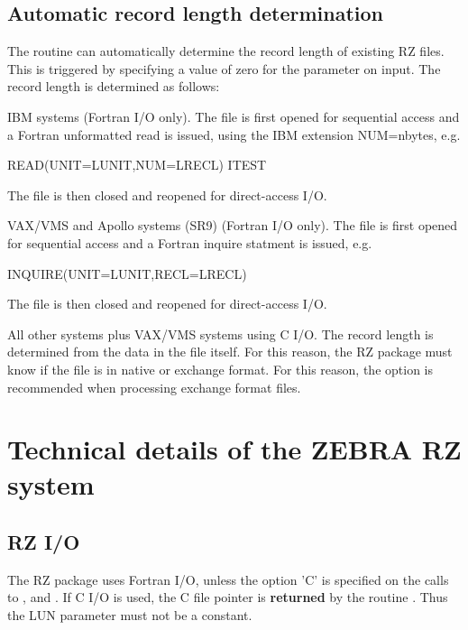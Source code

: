 \section{Automatic record length determination}

The routine  can automatically determine the 
record length of existing RZ files. This is triggered
by specifying a value of zero for the parameter 
on input. The record length is determined as follows:

\begin{UL}
\item IBM systems (Fortran I/O only). 
      The file is first opened for sequential
      access and a Fortran unformatted read is issued,
      using the IBM extension NUM=nbytes, e.g.
\begin{XMP}
            READ(UNIT=LUNIT,NUM=LRECL) ITEST
\end{XMP}
      The file is then closed and reopened for direct-access
      I/O.
\item VAX/VMS and Apollo systems (SR9) (Fortran I/O only). 
      The file is first
      opened for sequential access and a Fortran inquire
      statment is issued, e.g.
\begin{XMP}
            INQUIRE(UNIT=LUNIT,RECL=LRECL)
\end{XMP}
      The file is then closed and reopened for direct-access
      I/O.
\item All other systems plus VAX/VMS systems using C I/O.
      The record length is determined from the data in the file
      itself. For this reason, the RZ package must know if the
      file is in native or exchange format.
      For this reason, the option  is recommended
      when processing exchange format files.
\end{UL}

\chapter{Technical details of the ZEBRA RZ system}

\section{RZ I/O}

The RZ package uses Fortran I/O, unless the option 'C' is specified
on the calls to ,  and .
If C I/O is used, the C file pointer is {\bf returned} by the
routine . Thus the LUN parameter must not be a constant.

